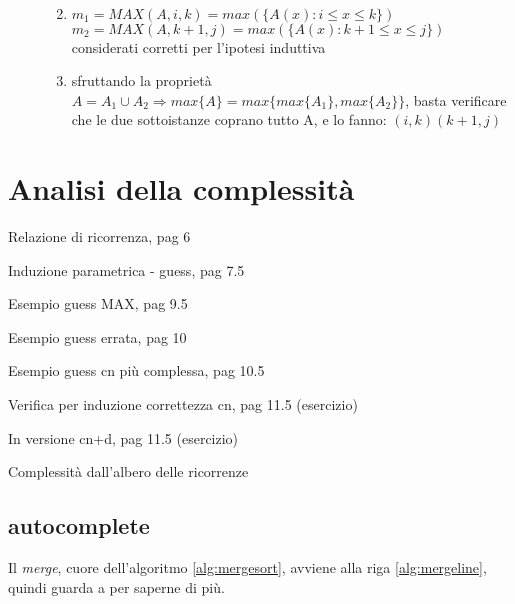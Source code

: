 \begin{description}
\begin{enumerate}[noitemsep,topsep=0pt,parsep=0pt,partopsep=0pt]
\begin{equation*}
\begin{split}
                    \end{split}
                \end{equation*}
            \item 
                $m_1 = MAX(A,i,k) = max(\{A(x):i \leq x \leq k \}) $ \\
                $m_2 = MAX(A,k+1,j) = max(\{A(x):k+1 \leq x \leq j \}) $ \\
                considerati corretti per l'ipotesi induttiva
            \item sfruttando la proprietà $ A = A_1 \cup A_2 \Rightarrow max\{A\} = max\{max\{A_1\}, max\{A_2\}\}$,
                basta verificare che le due sottoistanze coprano tutto A, e lo fanno: $(i,k)(k+1,j)$
        \end{enumerate}
\end{description}

\section{Analisi della complessità}

Relazione di ricorrenza, pag 6

Induzione parametrica - guess, pag 7.5

Esempio guess MAX, pag 9.5

Esempio guess errata, pag 10

Esempio guess cn più complessa, pag 10.5

Verifica per induzione correttezza cn, pag 11.5 (esercizio)

In versione cn+d, pag 11.5 (esercizio)

Complessità dall'albero delle ricorrenze

\subsection{autocomplete}

Il \textit{merge}, cuore dell'algoritmo \ref{alg:mergesort}, avviene alla riga \ref{alg:mergeline}, quindi guarda a  per saperne di più.

